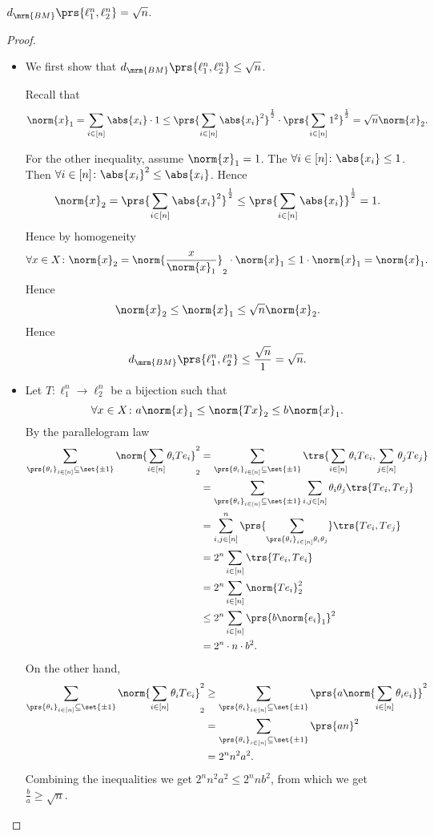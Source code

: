 \documentclass[10pt, twoside]{book}
\begin{document}
\begin{proposition}
$d_{\mrm{BM}}\prs{\ell_1^n, \ell_2^n} = \sqrt{n}$.
\end{proposition}

\begin{proof}
\begin{itemize}
\item We first show that $d_{\mrm{BM}}\prs{\ell_1^n, \ell_2^n} \leq \sqrt{n}$.

Recall that
\[\norm{x}_1 = \sum_{i \in [n]} \abs{x_i} \cdot 1 \leq \prs{\sum_{i \in [n]} \abs{x_i}^2}^{\frac{1}{2}} \cdot \prs{\sum_{i \in [n]} 1^2}^{\frac{1}{2}} = \sqrt{n} \norm{x}_2 \text{.}\]

For the other inequality, assume $\norm{x}_1 = 1$. The $\forall i \in [n] \colon \abs{x_i} \leq 1$. Then $\forall i \in [n] \colon \abs{x_i}^2 \leq \abs{x_i}$.
Hence
\[\norm{x}_2 = \prs{\sum_{i \in [n]} \abs{x_i}^2}^{\frac{1}{2}} \leq \prs{\sum_{i \in [n]} \abs{x_i}}^{\frac{1}{2}} = 1 \text{.}\]
Hence by homogeneity
\[\forall x \in X \colon \norm{x}_2 = \norm{\frac{x}{\norm{x}_1}}_2 \cdot \norm{x}_1 \leq 1 \cdot \norm{x}_1 = \norm{x}_1 \text{.}\]
Hence
\[\norm{x}_2 \leq \norm{x}_1 \leq \sqrt{n} \norm{x}_2 \text{.}\]
Hence
\[d_{\mrm{BM}}\prs{\ell_1^n, \ell_2^n} \leq \frac{\sqrt{n}}{1} = \sqrt{n} \text{.}\]

\item Let $T \colon \ell_1^n \to \ell_2^n$ be a bijection such that
\[\forall x \in X \colon a \norm{x}_1 \leq \norm{T x}_2 \leq b \norm{x}_1 \text{.}\]
By the parallelogram law
\begin{align*}
\sum_{\prs{\theta_i}_{i \in [n]} \subseteq \set{\pm 1}} \norm{\sum_{i \in [n]} \theta_i T e_i}_2^2
&=
\sum_{\prs{\theta_i}_{i \in [n]} \subseteq \set{\pm 1}} \trs{\sum_{i \in [n]} \theta_i T e_i, \sum_{j \in [n]} \theta_j T e_j}
\\&=
\sum_{\prs{\theta_i}_{i \in [n]} \subseteq \set{\pm 1}} \sum_{i,j \in [n]} \theta_i \theta_j \trs{T e_i, T e_j}
\\&=
\sum_{i,j \in [n]}^n \prs{\sum_{\prs{\theta_i}_{i \in [n]} \theta_i \theta_j}} \trs{T e_i, T e_j}
\\&=
2^n \sum_{i \in [n]} \trs{T e_i, T e_i}
\\&=
2^n \sum_{i \in [n]} \norm{T e_i}_2^2
\\&\leq
2^n \sum_{i \in [n]} \prs{b \norm{e_i}_1}^2
\\&=
2^n \cdot n \cdot b^2 \text{.}
\end{align*}
On the other hand,
\begin{align*}
\sum_{\prs{\theta_i}_{i \in [n]} \subseteq \set{\pm 1}} \norm{\sum_{i \in [n]} \theta_i T e_i}_2^2
&\geq
\sum_{\prs{\theta_i}_{i \in [n]} \subseteq \set{\pm 1}} \prs{a \norm{\sum_{i \in [n]} \theta_i e_i}}^2
\\&=
\sum_{\prs{\theta_i}_{i \in [n]} \subseteq \set{\pm 1}} \prs{a n}^2
\\&=
2^n n^2 a^2 \text{.}
\end{align*}
Combining the inequalities we get $2^n n^2 a^2 \leq 2^n n b^2$, from which we get $\frac{b}{a} \geq \sqrt{n}$.
\end{itemize}
\end{proof}
\end{document}
